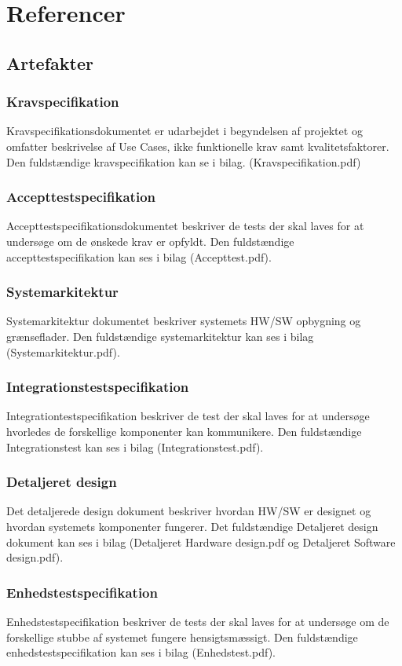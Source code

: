 \chapter{Referencer}
\section{Artefakter}
\subsection{Kravspecifikation}
Kravspecifikationsdokumentet er udarbejdet i begyndelsen af projektet og omfatter beskrivelse af Use Cases, ikke funktionelle krav samt kvalitetsfaktorer. Den fuldstændige kravspecifikation kan se i bilag. (Kravspecifikation.pdf)

\subsection{Accepttestspecifikation}
Accepttestspecifikationsdokumentet beskriver de tests der skal laves for at undersøge om de ønskede krav er opfyldt. Den fuldstændige accepttestspecifikation kan ses i bilag (Accepttest.pdf).

\subsection{Systemarkitektur}
Systemarkitektur dokumentet beskriver systemets HW/SW opbygning og grænseflader. Den fuldstændige systemarkitektur kan ses i bilag (Systemarkitektur.pdf).

\subsection{Integrationstestspecifikation}
Integrationtestspecifikation beskriver de test der skal laves for at undersøge hvorledes de forskellige komponenter kan kommunikere. Den fuldstændige Integrationstest kan ses i bilag (Integrationstest.pdf).

\subsection{Detaljeret design}
\label{ch:DetajlDesign}
Det detaljerede design dokument beskriver hvordan HW/SW er designet og hvordan systemets komponenter fungerer. Det fuldstændige Detaljeret design dokument kan ses i bilag (Detaljeret Hardware design.pdf og Detaljeret Software design.pdf).

\subsection{Enhedstestspecifikation}
Enhedstestspecifikation beskriver de tests der skal laves for at undersøge om de forskellige stubbe af systemet fungere hensigtsmæssigt. Den fuldstændige enhedstestspecifikation kan ses i bilag (Enhedstest.pdf).

